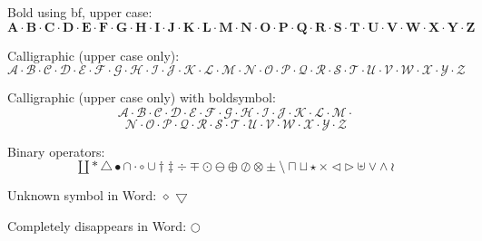 \documentclass[12pt,a4paper]{article}
\theoremstyle{clearprint}
\begin{document}
\noindent 
Bold using bf, upper case:
\begin{equation}
\mathbf{A}\cdot \mathbf{B}\cdot \mathbf{C}\cdot \mathbf{D}\cdot \mathbf{E}\cdot \mathbf{F}\cdot \mathbf{G}\cdot \mathbf{H}\cdot \mathbf{I}\cdot \mathbf{J}\cdot \mathbf{K}\cdot \mathbf{L}\cdot \mathbf{M}\cdot \mathbf{N}\cdot \mathbf{O}\cdot \mathbf{P}\cdot \mathbf{Q}\cdot \mathbf{R}\cdot \mathbf{S}\cdot \mathbf{T}\cdot \mathbf{U}\cdot \mathbf{V}\cdot \mathbf{W}\cdot \mathbf{X}\cdot \mathbf{Y}\cdot \mathbf{Z}
\end{equation}

\noindent 
Calligraphic (upper case only):
\begin{equation}
\mathcal{A} \cdot \mathcal{B} \cdot \mathcal{C} \cdot \mathcal{D} \cdot \mathcal{E} \cdot \mathcal{F} \cdot \mathcal{G} \cdot \mathcal{H} \cdot \mathcal{I} \cdot \mathcal{J} \cdot \mathcal{K} \cdot \mathcal{L} \cdot \mathcal{M} \cdot \mathcal{N} \cdot \mathcal{O} \cdot \mathcal{P} \cdot \mathcal{Q} \cdot \mathcal{R} \cdot \mathcal{S} \cdot \mathcal{T} \cdot \mathcal{U} \cdot \mathcal{V} \cdot \mathcal{W} \cdot \mathcal{X} \cdot \mathcal{Y} \cdot \mathcal{Z}
\end{equation}

\noindent
Calligraphic (upper case only) with boldsymbol:
\begin{equation}
\boldsymbol{\mathcal{A}\cdot \mathcal{B}\cdot \mathcal{C}\cdot \mathcal{D}\cdot \mathcal{E}\cdot \mathcal{F}\cdot \mathcal{G}\cdot \mathcal{H}\cdot \mathcal{I}\cdot \mathcal{J}\cdot \mathcal{K}\cdot \mathcal{L}\cdot \mathcal{M}\cdot }
\end{equation}
\begin{equation}
\boldsymbol{
\mathcal{N}\cdot \mathcal{O}\cdot \mathcal{P}\cdot \mathcal{Q}\cdot \mathcal{R}\cdot \mathcal{S}\cdot \mathcal{T}\cdot \mathcal{U}\cdot \mathcal{V}\cdot \mathcal{W}\cdot \mathcal{X}\cdot \mathcal{Y}\cdot \mathcal{Z}}
\end{equation}

\noindent 
Binary operators: %
\begin{equation}
\amalg \ast \bigtriangleup \bullet \cap \cdot \circ \cup \dagger \ddagger \div \mp \odot \ominus \oplus \oslash \otimes \pm \setminus \sqcap \sqcup \star \times \triangleleft \triangleright \uplus \vee \wedge \wr
\end{equation}

Unknown symbol in Word: $\diamond$ $\bigtriangledown$

Completely disappears in Word: $\bigcirc$
\end{document}
